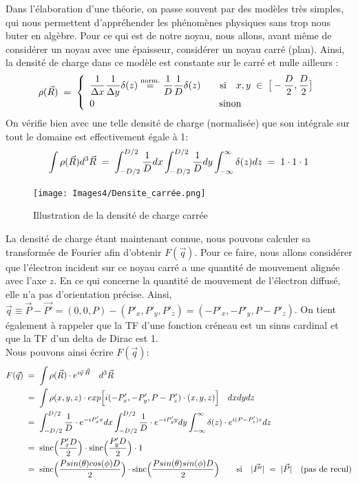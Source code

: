 Dans l'élaboration d'une théorie, on passe souvent par des modèles très simples, qui nous permettent d'appréhender les phénomènes physiques sans trop nous buter en algèbre. Pour ce qui est de notre noyau, nous allons, avant même de considérer un noyau avec une épaisseur, considérer un noyau carré (plan). Ainsi, la densité de charge dans ce modèle est constante sur le carré et nulle ailleurs :
\begin{equation*}
    \rho(\vec{R}) \; = \;
    \left\{
    \begin{array}{ll}
        \dfrac{1}{\Delta x} \dfrac{1}{\Delta y} \delta(z)
        \overset{\text{norm.}}= 
        \dfrac{1}{D}\dfrac{1}{D}\delta(z)
        \qquad \text{si} \quad
        x,y \;\in\; \big[ -\dfrac{D}{2},\dfrac{D}{2} \big]
    \\[7pt]
        0 \qquad \qquad \qquad \qquad \qquad \qquad \quad \text{sinon}
    \end{array}
    \right.
\end{equation*}
On vérifie bien avec une telle densité de charge (normalisée) que son intégrale sur tout le domaine est effectivement égale à 1:
\begin{equation*}
    \int \rho(\vec{R}) d^3\vec{R}
    \; = \;
    \int_{-D/2}^{D/2}\dfrac{1}{D} dx
    \int_{-D/2}^{D/2}\dfrac{1}{D} dy
    \int_{-\infty}^{\infty}\delta (z)dz
    \; = \; 1\cdot 1 \cdot 1
\end{equation*}
\begin{figure}[H]
    \centering
    \texttt{[image: Images4/Densite\_carrée.png]}
    \caption{Illustration de la densité de charge carrée}
    \label{fig:Densité carrée}
\end{figure}
La densité de charge étant maintenant connue, nous pouvons calculer sa transformée de Fourier afin d'obtenir $F(\vec{q})$. Pour ce faire, nous allons considérer que l'électron incident sur ce noyau carré a une quantité de mouvement alignée avec l'axe $z$. En ce qui concerne la quantité de mouvement de l'électron diffusé, elle n'a pas d'orientation précise. Ainsi, $\vec{q} \equiv \vec{P}-\vec{P'} = (0,0,P)-(P'_x,P'_y,P'_z) = (-P'_x,-P'_y,P-P'_z) $. On tient également à rappeler que la TF d'une fonction créneau est un sinus cardinal et que la TF d'un delta de Dirac est 1.\\
Nous pouvons ainsi écrire $F(\vec{q})$:
\begin{align*}
    F(\vec{q}) 
    &\; = \;
    \int \rho(\vec{R}) \cdot e^{i\vec{q} \cdot\vec{R}} \quad d^3\vec{R}\\
    &\; = \;
    \int \rho(x,y,z) \cdot exp\Big[i(-P'_x,-P'_y,P-P'_z) \cdot(x,y,z)\Big] \quad dxdydz\\
    &\; = \;
    \int_{-D/2}^{D/2}\dfrac{1}{D} \cdot e^{-iP'_xx} dx
    \int_{-D/2}^{D/2}\dfrac{1}{D} \cdot e^{-iP'_yy} dy
    \int_{-\infty}^{\infty} \delta(z) \cdot e^{i(P-P'_z)z} dz\\
    &\; = \;
    \text{sinc}\Big(\dfrac{P'_xD}{2}\Big) \cdot
    \text{sinc}\Big(\dfrac{P'_yD}{2}\Big) \cdot 1\\
    &\; = \;
    \text{sinc}\Big(\dfrac{P sin(\theta)cos(\phi)D}{2}\Big) \cdot
    \text{sinc}\Big(\dfrac{P sin(\theta)sin(\phi)D}{2}\Big)
    \qquad \text{si} \quad |\vec{P'}|\; = \;|\vec{P}| \quad \text{(pas de recul)}
\end{align*}

